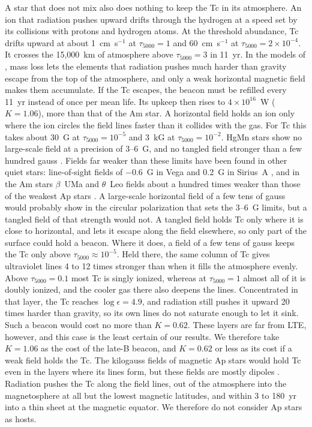 \documentclass[final,5p]{elsarticle}
\begin{document}
A star that does not mix also does nothing to keep the Tc in its atmosphere. An ion that radiation pushes upward drifts through the hydrogen at a speed set by its collisions with protons and hydrogen atoms. At the threshold abundance, Tc drifts upward at about 1~cm~s$^{-1}$ at $\tau_{5000} = 1$ and 60~cm~s$^{-1}$ at $\tau_{5000} = 2\times10^{-4}$. It crosses the 15{,}000~km of atmosphere above $\tau_{5000} = 3$ in 11~yr. In the models of \citet{AlecianStift2019}, mass loss lets the elements that radiation pushes much harder than gravity escape from the top of the atmosphere, and only a weak horizontal magnetic field makes them accumulate. If the Tc escapes, the beacon must be refilled every 11~yr instead of once per mean life. Its upkeep then rises to $4\times10^{16}$~W ($K = 1.06$), more than that of the Am star. A horizontal field holds an ion only where the ion circles the field lines faster than it collides with the gas. For Tc this takes about 30~G at $\tau_{5000} = 10^{-5}$ and 3~kG at $\tau_{5000} = 10^{-2}$. HgMn stars show no large-scale field at a precision of 3--6~G, and no tangled field stronger than a few hundred gauss \citep{Kochukhov2013}. Fields far weaker than these limits have been found in other quiet stars: line-of-sight fields of $-0.6$~G in Vega and 0.2~G in Sirius~A \citep{Lignieres2009, Petit2011}, and in the Am stars $\beta$~UMa and $\theta$~Leo fields about a hundred times weaker than those of the weakest Ap stars \citep{Blazere2016}. A large-scale horizontal field of a few tens of gauss would probably show in the circular polarization that sets the 3--6~G limits, but a tangled field of that strength would not. A tangled field holds Tc only where it is close to horizontal, and lets it escape along the field elsewhere, so only part of the surface could hold a beacon. Where it does, a field of a few tens of gauss keeps the Tc only above $\tau_{5000} \approx 10^{-5}$. Held there, the same column of Tc gives  ultraviolet lines 4 to 12 times stronger than when it fills the atmosphere evenly. Above $\tau_{5000} = 0.1$ most Tc is singly ionized, whereas at $\tau_{5000} = 1$ almost all of it is doubly ionized, and the cooler gas there also deepens the lines. Concentrated in that layer, the Tc reaches $\log\epsilon = 4.9$, and radiation still pushes it upward 20 times harder than gravity, so its own lines do not saturate enough to let it sink. Such a beacon would cost no more than $K = 0.62$. These layers are far from LTE, however, and this case is the least certain of our results. We therefore take $K = 1.06$ as the cost of the late-B beacon, and $K = 0.62$ or less as its cost if a weak field holds the Tc. The kilogauss fields of magnetic Ap stars would hold Tc even in the layers where its lines form, but these fields are mostly dipoles \citep{Kochukhov2019}. Radiation pushes the Tc along the field lines, out of the atmosphere into the magnetosphere at all but the lowest magnetic latitudes, and within 3 to 180~yr into a thin sheet at the magnetic equator. We therefore do not consider Ap stars as hosts.
\end{document}
